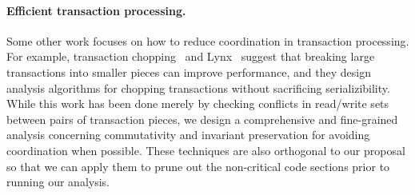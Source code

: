 \paragraph{Efficient transaction processing.} Some other work focuses on how to reduce
coordination in transaction processing. For example, transaction chopping~\cite{Shasha1995Chopping} and
Lynx~\cite{Zhang2013TransactionChain} suggest that breaking large transactions into smaller pieces
can improve performance, and they design analysis algorithms for chopping transactions
without sacrificing serializibility. While this work has been done merely by checking
conflicts in read/write sets between pairs of transaction pieces, we design a comprehensive
and fine-grained analysis concerning commutativity
and invariant preservation for avoiding coordination when possible. These techniques are also
orthogonal to our proposal so that we can apply them to prune out the non-critical code sections prior
to running our analysis. 




